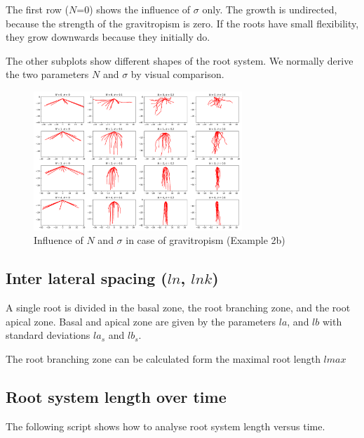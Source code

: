 The first row ($N$=0) shows the influence of $\sigma$ only. The growth is undirected, because the strength of the gravitropism is zero. If the roots have small flexibility, they grow downwards because they initially do. 

The other subplots show different shapes of the root system. We normally derive the two parameters $N$ and $\sigma$ by visual comparison.  

\begin{figure}
\centering
\includegraphics[width=0.7\textwidth]{fig_gravitropism.png}
\caption{Influence of $N$ and $\sigma$ in case of gravitropism (Example 2b) } \label{fig:tropism}
\end{figure}




\subsection{Inter lateral spacing ($ln$, $lnk$)}

A single root is divided in the basal zone, the root branching zone, and the root apical zone. Basal and apical zone are given by the parameters $la$, and $lb$ with standard deviations $la_s$ and $lb_s$. 

The root branching zone can be calculated form the maximal root length $lmax$





\subsection{Root system length over time}

The following script shows how to analyse root system length versus time. 



